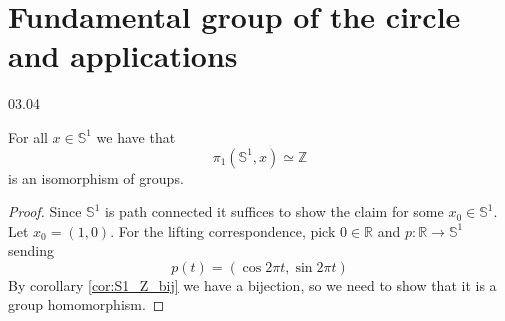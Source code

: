 \section{Fundamental group of the circle and applications}
03.04

\begin{theorem}
    For all \( x \in \mathbb{S}^1 \)
    we have that
    \[
      \pi_1(\mathbb{S}^1, x) \simeq \mathbb{Z}
    \] 
    is an isomorphism of groups.
\end{theorem}

\begin{proof}
    Since \( \mathbb{S}^1 \) is path connected
    it suffices to show the claim for some \( x_0 \in \mathbb{S}^1 \).
    Let \( x_0 = (1, 0) \).
    For the lifting correspondence, pick
    \( 0 \in \mathbb{R} \) and
    \( p: \mathbb{R} \to \mathbb{S}^1 \)
    sending
    \[
      p(t) = (\cos 2 \pi t, \sin 2 \pi t)
    \]
    By corollary \ref{cor:S1_Z_bij}
    we have a bijection, so we need to show
    that it is a group homomorphism.


\end{proof}
